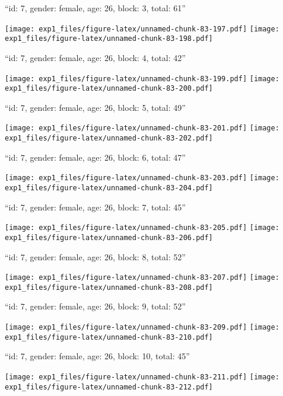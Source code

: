 \documentclass[11pt,,]{article}
\begin{document}
\newpage
[1] 

``id: 7, gender: female, age: 26, block: 3, total: 61''

\texttt{[image: exp1\_files/figure-latex/unnamed-chunk-83-197.pdf]}
\texttt{[image: exp1\_files/figure-latex/unnamed-chunk-83-198.pdf]}

\newpage
[1] 

``id: 7, gender: female, age: 26, block: 4, total: 42''

\texttt{[image: exp1\_files/figure-latex/unnamed-chunk-83-199.pdf]}
\texttt{[image: exp1\_files/figure-latex/unnamed-chunk-83-200.pdf]}

\newpage
[1] 

``id: 7, gender: female, age: 26, block: 5, total: 49''

\texttt{[image: exp1\_files/figure-latex/unnamed-chunk-83-201.pdf]}
\texttt{[image: exp1\_files/figure-latex/unnamed-chunk-83-202.pdf]}

\newpage
[1] 

``id: 7, gender: female, age: 26, block: 6, total: 47''

\texttt{[image: exp1\_files/figure-latex/unnamed-chunk-83-203.pdf]}
\texttt{[image: exp1\_files/figure-latex/unnamed-chunk-83-204.pdf]}

\newpage
[1] 

``id: 7, gender: female, age: 26, block: 7, total: 45''

\texttt{[image: exp1\_files/figure-latex/unnamed-chunk-83-205.pdf]}
\texttt{[image: exp1\_files/figure-latex/unnamed-chunk-83-206.pdf]}

\newpage
[1] 

``id: 7, gender: female, age: 26, block: 8, total: 52''

\texttt{[image: exp1\_files/figure-latex/unnamed-chunk-83-207.pdf]}
\texttt{[image: exp1\_files/figure-latex/unnamed-chunk-83-208.pdf]}

\newpage
[1] 

``id: 7, gender: female, age: 26, block: 9, total: 52''

\texttt{[image: exp1\_files/figure-latex/unnamed-chunk-83-209.pdf]}
\texttt{[image: exp1\_files/figure-latex/unnamed-chunk-83-210.pdf]}

\newpage
[1] 

``id: 7, gender: female, age: 26, block: 10, total: 45''

\texttt{[image: exp1\_files/figure-latex/unnamed-chunk-83-211.pdf]}
\texttt{[image: exp1\_files/figure-latex/unnamed-chunk-83-212.pdf]}
\end{document}
